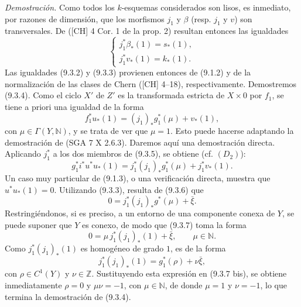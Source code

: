 \emph{Demostración.} Como todos los $k$-esquemas considerados son lisos, es inmediato, por razones de dimensión, que los morfismos $j_1$ y $\beta$ (resp. $j_1$ y $v$) son transversales. De ([CH] 4 Cor. 1 de la prop. 2) resultan entonces las igualdades
\[
\begin{cases}
j_1^*\beta_*(1)=s_*(1),\\
j_1^*v_*(1)=k_*(1).
\end{cases}
\]
Las igualdades (9.3.2) y (9.3.3) provienen entonces de (9.1.2) y de la normalización de las clases de Chern ([CH] 4--18), respectivamente. Demostremos (9.3.4). Como el ciclo $X'$ de $Z'$ es la transformada estricta de $X\times0$ por $f_1$, se tiene a priori una igualdad de la forma
\[
f_1^*u_*(1)=(j_1)_*g_1^*(\mu)+v_*(1),
\tag{9.3.5}
\]
con $\mu\in\Gamma(Y,\mathbb N)$, y se trata de ver que $\mu=1$. Esto puede hacerse adaptando la demostración de (SGA 7 X 2.6.3). Daremos aquí una demostración directa. Aplicando $j_1^*$ a los dos miembros de (9.3.5), se obtiene (cf. $(D_2)$):
\[
g_1^*i^*u^*u_*(1)=j_1^*(j_1)_*g_1^*(\mu)+j_1^*v_*(1).
\tag{9.3.6}
\]
Un caso muy particular de (9.1.3), o una verificación directa, muestra que $u^*u_*(1)=0$. Utilizando (9.3.3), resulta de (9.3.6) que
\[
0=j_1^*(j_1)_*g^*(\mu)+\bar\xi.
\tag{9.3.7}
\]
Restringiéndonos, si es preciso, a un entorno de una componente conexa de $Y$, se puede suponer que $Y$ es conexo, de modo que (9.3.7) toma la forma
\[
0=\mu\,j_1^*(j_1)_*(1)+\bar\xi,\qquad \mu\in\mathbb N.
\tag{9.3.7 bis}
\]
Como $j_1^*(j_1)_*(1)$ es homogéneo de grado $1$, es de la forma
\[
j_1^*(j_1)_*(1)=g_1^*(\rho)+\nu\bar\xi,
\]
con $\rho\in C^1(Y)$ y $\nu\in\mathbb Z$. Sustituyendo esta expresión en (9.3.7 bis), se obtiene inmediatamente $\rho=0$ y $\mu\nu=-1$, con $\mu\in\mathbb N$, de donde $\mu=1$ y $\nu=-1$, lo que termina la demostración de (9.3.4).
